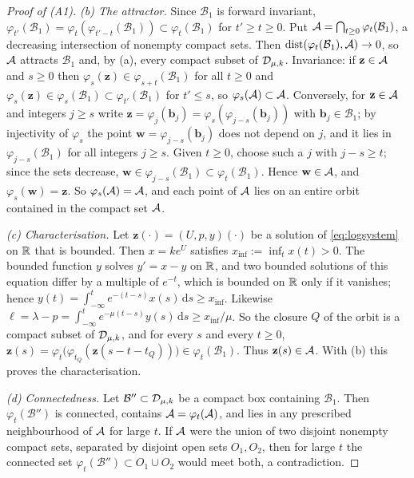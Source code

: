 \begin{proof}[Proof of (A1)]
\emph{(b) The attractor.} Since $\mathcal B_1$ is forward invariant, $\varphi_{t'}(\mathcal B_1)=\varphi_t(\varphi_{t'-t}(\mathcal B_1))\subset\varphi_t(\mathcal B_1)$ for $t'\ge t\ge0$. Put $\mathcal A=\bigcap_{t\ge0}\varphi_t(\mathcal B_1)$, a decreasing intersection of nonempty compact sets. Then $\operatorname{dist}(\varphi_t(\mathcal B_1),\mathcal A)\to0$, so $\mathcal A$ attracts $\mathcal B_1$ and, by (a), every compact subset of $\mathcal D_{\mu,k}$. Invariance: if $\mathbf z\in\mathcal A$ and $s\ge0$ then $\varphi_s(\mathbf z)\in\varphi_{s+t}(\mathcal B_1)$ for all $t\ge0$ and $\varphi_s(\mathbf z)\in\varphi_s(\mathcal B_1)\subset\varphi_{t'}(\mathcal B_1)$ for $t'\le s$, so $\varphi_s(\mathcal A)\subset\mathcal A$. Conversely, for $\mathbf z\in\mathcal A$ and integers $j\ge s$ write $\mathbf z=\varphi_j(\mathbf b_j)=\varphi_s(\varphi_{j-s}(\mathbf b_j))$ with $\mathbf b_j\in\mathcal B_1$; by injectivity of $\varphi_s$ the point $\mathbf w=\varphi_{j-s}(\mathbf b_j)$ does not depend on $j$, and it lies in $\varphi_{j-s}(\mathcal B_1)$ for all integers $j\ge s$. Given $t\ge0$, choose such a $j$ with $j-s\ge t$; since the sets decrease, $\mathbf w\in\varphi_{j-s}(\mathcal B_1)\subset\varphi_t(\mathcal B_1)$. Hence $\mathbf w\in\mathcal A$, and $\varphi_s(\mathbf w)=\mathbf z$. So $\varphi_s(\mathcal A)=\mathcal A$, and each point of $\mathcal A$ lies on an entire orbit contained in the compact set $\mathcal A$.

\emph{(c) Characterisation.} Let $\mathbf z(\cdot)=(U,p,y)(\cdot)$ be a solution of \eqref{eq:logsystem} on $\mathbb R$ that is bounded. Then $x=ke^{U}$ satisfies $x_{\inf}:=\inf_tx(t)>0$. The bounded function $y$ solves $y'=x-y$ on $\mathbb R$, and two bounded solutions of this equation differ by a multiple of $e^{-t}$, which is bounded on $\mathbb R$ only if it vanishes; hence $y(t)=\int_{-\infty}^te^{-(t-s)}x(s)\,\mathrm ds\ge x_{\inf}$. Likewise $\ell=\lambda-p=\int_{-\infty}^te^{-\mu(t-s)}y(s)\,\mathrm ds\ge x_{\inf}/\mu$. So the closure $Q$ of the orbit is a compact subset of $\mathcal D_{\mu,k}$, and for every $s$ and every $t\ge0$, $\mathbf z(s)=\varphi_t\bigl(\varphi_{t_Q}(\mathbf z(s-t-t_Q))\bigr)\in\varphi_t(\mathcal B_1)$. Thus $\mathbf z(s)\in\mathcal A$. With (b) this proves the characterisation.

\emph{(d) Connectedness.} Let $\mathcal B''\subset\mathcal D_{\mu,k}$ be a compact box containing $\mathcal B_1$. Then $\varphi_t(\mathcal B'')$ is connected, contains $\mathcal A=\varphi_t(\mathcal A)$, and lies in any prescribed neighbourhood of $\mathcal A$ for large $t$. If $\mathcal A$ were the union of two disjoint nonempty compact sets, separated by disjoint open sets $O_1,O_2$, then for large $t$ the connected set $\varphi_t(\mathcal B'')\subset O_1\cup O_2$ would meet both, a contradiction.
\end{proof}

